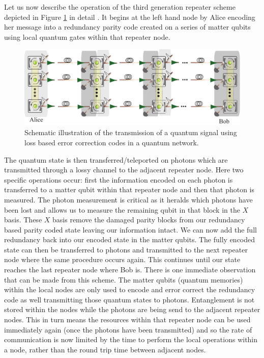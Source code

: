 \documentclass[twocolumn, aps, rmp, amsmath, amssymb, nofootinbib, superscriptaddress, longbibliography, floatfix, table-of-contents, eqsecnum]{revtex4-1}
\newcommand{\comment}[1]{{\color{blue}{\textbf{#1}}}}
\begin{document}
Let us now describe the operation of the third generation repeater scheme  depicted in Figure \ref{fig9} in detail \cite{munro12,MKLLJ14}. It begins at the left hand node by Alice encoding her message into a redundancy parity code created on a series of matter qubits  using local quantum gates within that repeater node. 
\begin{figure}[!htb]
\includegraphics[width=\textwidth]{repeaters_9}
\caption{\comment{Redo fig}Schematic illustration of the transmission of a quantum signal using loss based error correction codes in a quantum network. }
\label{fig9}
\end{figure}
The quantum state is then transferred/teleported on photons which are transmitted through a lossy channel to the adjacent repeater node. Here two specific operations occur: first the information encoded on each photon is transferred to a matter qubit within that repeater node and then that photon is measured. The photon measurement is critical as it heralds which photons have been lost and allows us to measure the remaining qubit in that block in the $X$ basis. These  $X$ basis remove the damaged parity blocks from our redundancy based parity coded state leaving our information intact. We can now add the full redundancy back into our encoded state in the matter qubits.  The fully encoded state can then be transferred to photons and transmitted to the next repeater node where the same procedure occurs again. This continues until our state reaches the last repeater node where Bob is. There is one immediate observation that can be made from this scheme. The matter qubits (quantum memories) within the local nodes are only used to encode and error correct the redundancy code as well transmitting those quantum states to photons. Entanglement is not stored within the nodes while the photons are being send to the adjacent repeater nodes. This in turn means the resources within that repeater node can be used immediately again (once the photons have been transmitted) and so the rate of communication is now limited by the time to perform the local operations within a node, rather than the round trip time between adjacent nodes. 
\end{document}
